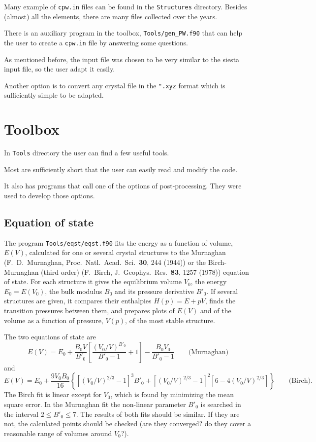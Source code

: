 \documentclass[11pt]{article}
\begin{document}
Many example of \texttt{cpw.in} files can be found in the \texttt{Structures} directory.
Besides (almost) all the elements, there are many files collected over the years.

There is an auxiliary program in the toolbox, \texttt{Tools/gen\_PW.f90}
that can help the user to create a \texttt{cpw.in} file by answering some questions.

As mentioned before, the input file was chosen to be very similar to the
{\sc siesta} input file, so the user adapt it easily.

Another option is to convert any crystal file in the \texttt{".xyz} format
which is sufficiently simple to be adapted.

\section{Toolbox}

In \texttt{Tools} directory the user can find a few useful tools.

Most are sufficiently short that the user can easily read and modify the code.

It also has programs that call one of the options of post-processing.
They were used to develop those options.

\subsection{Equation of state}
\label{sec:eqst}

The program \texttt{Tools/eqst/eqst.f90} fits the energy as a function of volume,
$E(V)$, calculated for one or several crystal structures to the
Murnaghan (F.~D.~Murnaghan, Proc.\ Natl.\ Acad.\ Sci.\ \textbf{30}, 244 (1944))
or the Birch-Murnaghan (third order) (F.~Birch, J.\ Geophys.\ Res.\ \textbf{83}, 1257 (1978))
equation of state.
For each structure it gives the equilibrium volume $V_0$, the energy $E_0=E(V_0)$,
the bulk modulus $B_0$ and its pressure derivative $B'_0$.
If several structures are given, it compares their enthalpies
$H(p) = E + pV$, finds the transition pressures between them,
and prepares plots of $E(V)$ and of the volume as a function of pressure, $V(p)$,
of the most stable structure.

The two equations of state are
\begin{equation}
E(V) = E_0 + \frac{B_0 V}{B'_0} \left[ \frac{(V_0/V)^{B'_0}}{B'_0-1} + 1 \right]
       - \frac{B_0 V_0}{B'_0-1}
\qquad \text{(Murnaghan)}
\end{equation}
and
\begin{equation}
E(V) = E_0 + \frac{9 V_0 B_0}{16} \left\{ \left[ (V_0/V)^{2/3} - 1 \right]^3 B'_0
       + \left[ (V_0/V)^{2/3} - 1 \right]^2 \left[ 6 - 4 (V_0/V)^{2/3} \right] \right\}
\qquad \text{(Birch)} .
\end{equation}
The Birch fit is linear except for $V_0$, which is found by minimizing the
mean square error.  In the Murnaghan fit the non-linear parameter
$B'_0$ is searched in the interval $2 \le B'_0 \le 7$.
The results of both fits should be similar.  If they are not,
the calculated points should be checked (are they converged? do they cover
a reasonable range of volumes around $V_0$?).
\end{document}
